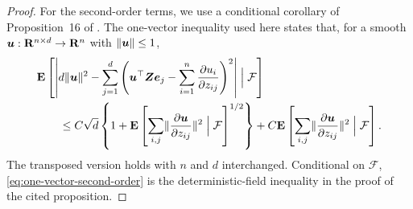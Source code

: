 \documentclass{article}
\theoremstyle{plain} %
\theoremstyle{definition} %
\theoremstyle{definition} %
\begin{document}
\begin{proof}
For the second-order terms, we use a conditional corollary of
Proposition~16 of \citet{bellec2022derivatives}. The one-vector inequality
used here states that, for a smooth
$\boldsymbol{u}:{\mathbf{R}}^{n\times d}\to{\mathbf{R}}^n$ with $\lVert\boldsymbol{u}\rVert\leq1$,
\begin{align}
    &{\mathbf{E}}\left[
       \left|d\lVert\boldsymbol{u}\rVert^2-
       \sum_{j=1}^d\left(
          \boldsymbol{u}^\top\boldsymbol{Z}\boldsymbol{e}_j-
          \sum_{i=1}^n\pdv{u_i}{z_{ij}}
       \right)^2\right|
       \mathrel{\Big|}\mathcal F
    \right]\notag\\
    &\qquad\leq
       C\sqrt d\left\{1+
       {\mathbf{E}}\left[
          \sum_{i,j}\lVert\pdv{\boldsymbol{u}}{z_{ij}}\rVert^2
          \mathrel{\Big|}\mathcal F
       \right]^{1/2}\right\}
       +C{\mathbf{E}}\left[
          \sum_{i,j}\lVert\pdv{\boldsymbol{u}}{z_{ij}}\rVert^2
          \mathrel{\Big|}\mathcal F
       \right].
    \label{eq:one-vector-second-order}
\end{align}
The transposed version holds with $n$ and $d$ interchanged.  Conditional on
$\mathcal F$, \eqref{eq:one-vector-second-order} is the deterministic-field inequality in the proof of the
cited proposition.


\end{proof}
\end{document}
